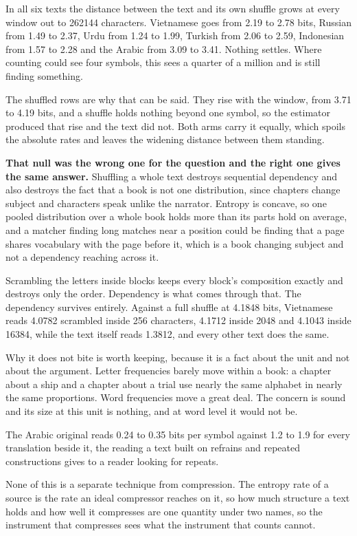 In all six texts the distance between the text and its own shuffle grows at every window out to 262144 characters. Vietnamese goes from 2.19 to 2.78 bits, Russian from 1.49 to 2.37, Urdu from 1.24 to 1.99, Turkish from 2.06 to 2.59, Indonesian from 1.57 to 2.28 and the Arabic from 3.09 to 3.41. Nothing settles. Where counting could see four symbols, this sees a quarter of a million and is still finding something.

The shuffled rows are why that can be said. They rise with the window, from 3.71 to 4.19 bits, and a shuffle holds nothing beyond one symbol, so the estimator produced that rise and the text did not. Both arms carry it equally, which spoils the absolute rates and leaves the widening distance between them standing.

\textbf{That null was the wrong one for the question and the right one gives the same answer.} Shuffling a whole text destroys sequential dependency and also destroys the fact that a book is not one distribution, since chapters change subject and characters speak unlike the narrator. Entropy is concave, so one pooled distribution over a whole book holds more than its parts hold on average, and a matcher finding long matches near a position could be finding that a page shares vocabulary with the page before it, which is a book changing subject and not a dependency reaching across it.

Scrambling the letters inside blocks keeps every block's composition exactly and destroys only the order. Dependency is what comes through that. The dependency survives entirely. Against a full shuffle at 4.1848 bits, Vietnamese reads 4.0782 scrambled inside 256 characters, 4.1712 inside 2048 and 4.1043 inside 16384, while the text itself reads 1.3812, and every other text does the same.

Why it does not bite is worth keeping, because it is a fact about the unit and not about the argument. Letter frequencies barely move within a book: a chapter about a ship and a chapter about a trial use nearly the same alphabet in nearly the same proportions. Word frequencies move a great deal. The concern is sound and its size at this unit is nothing, and at word level it would not be.

The Arabic original reads 0.24 to 0.35 bits per symbol against 1.2 to 1.9 for every translation beside it, the reading a text built on refrains and repeated constructions gives to a reader looking for repeats.

None of this is a separate technique from compression. The entropy rate of a source is the rate an ideal compressor reaches on it, so how much structure a text holds and how well it compresses are one quantity under two names, so the instrument that compresses sees what the instrument that counts cannot.

